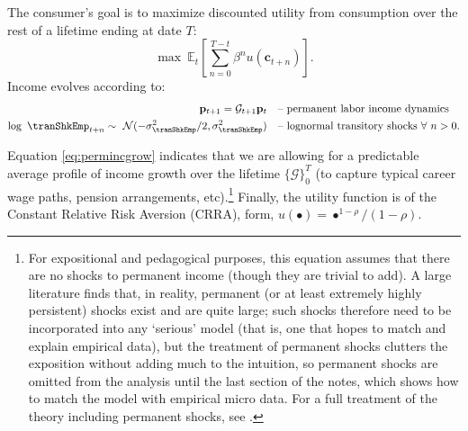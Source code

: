 \documentclass[titlepage, headings=optiontotocandhead]{econtex}
\begin{document}
The consumer's goal is to maximize discounted utility from consumption over the rest of a lifetime ending at date $T$:
  \begin{equation}\label{eq:MaxProb}
    \max~{\mathbb{E}}_{t}\left[\sum_{n=0}^{T-t}\beta^{n} u(\mathbf{c}_{t+n})\right].
  \end{equation}
Income evolves according to:
  \begin{equation}\begin{gathered}\begin{aligned}
        \mathbf{p}_{t+1}   = \mathcal{G}_{t+1}\mathbf{p}_{t}                                        & \text{~~ -- permanent labor income dynamics} \label{eq:permincgrow}
        \\ \log ~ \tranShkEmp_{t+n}  \sim ~\mathcal{N}(-\sigma_{\tranShkEmp}^{2}/2,\sigma_{\tranShkEmp}^{2}) & \text{~~ -- lognormal transitory shocks}~\forall~n>0 .
      \end{aligned}\end{gathered}\end{equation}

Equation \eqref{eq:permincgrow} indicates that we are allowing for a predictable average profile of income growth over the lifetime $\{\mathcal{G}\}_{0}^{T}$ (to capture typical career wage paths, pension arrangements, etc).\footnote{For expositional and pedagogical purposes, this equation assumes that there are no shocks to permanent income (though they are trivial to add).  A large literature finds that, in reality, permanent (or at least extremely highly persistent) shocks exist and are quite large; such shocks therefore need to be incorporated into any `serious' model (that is, one that hopes to match and explain empirical data), but the treatment of permanent shocks clutters the exposition without adding much to the intuition, so permanent shocks are omitted from the analysis until the last section of the notes, which shows how to match the model with empirical micro data.  For a full treatment of the theory including permanent shocks, see \cite{BufferStockTheory}.}  Finally, the utility function is of the Constant Relative Risk Aversion (CRRA), form, $u(\bullet) = \bullet^{1-\rho}/(1-\rho)$.
\end{document}
